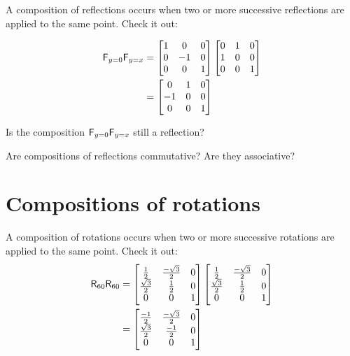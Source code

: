 \documentclass{ximera}
\begin{document}
A composition of reflections occurs when two or more successive
reflections are applied to the same point. Check it out:

\begin{align*}
\mathsf{F}_{y=0}\mathsf{F}_{y=x} &= \begin{bmatrix}
1 &  0 & 0\\
0 & -1 & 0\\
0 &  0 & 1
\end{bmatrix}
\begin{bmatrix}
0 & 1 & 0\\
1 & 0 & 0\\
0 & 0 & 1
\end{bmatrix}\\
&= \begin{bmatrix}
 0 & 1 & 0\\
-1 & 0 & 0\\
 0 & 0 & 1
\end{bmatrix}
\end{align*}


\begin{question}
Is the composition $\mathsf{F}_{y=0}\mathsf{F}_{y=x}$ still a reflection?
\end{question}


\begin{question}
Are compositions of reflections commutative?  Are they
associative?
\end{question}




\section{Compositions of rotations}


A composition of rotations occurs when two or more successive
rotations are applied to the same point. Check it out: 
\begin{align*}
\mathsf{R}_{60}\mathsf{R}_{60} &= \begin{bmatrix}
\frac{1}{2} & \frac{-\sqrt{3}}{2} & 0\\
\frac{\sqrt{3}}{2} & \frac{1}{2} & 0\\
0 & 0 & 1
\end{bmatrix}
\begin{bmatrix}
\frac{1}{2} & \frac{-\sqrt{3}}{2} & 0\\
\frac{\sqrt{3}}{2} & \frac{1}{2} & 0\\
0 & 0 & 1
\end{bmatrix}\\
&= \begin{bmatrix}
\frac{-1}{2} & \frac{-\sqrt{3}}{2} & 0\\
\frac{\sqrt{3}}{2} & \frac{-1}{2} & 0\\
0 & 0 & 1
\end{bmatrix}
\end{align*}
\end{document}
